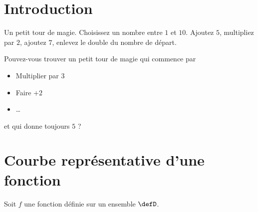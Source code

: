 
\section{Introduction}

\begin{Aprojeter}
    \begin{example} \label{ExemVmCkIH}
        Un petit tour de magie. Choisissez un nombre entre \( 1\) et \( 10\). Ajoutez \( 5\), multipliez par \( 2\), ajoutez \( 7\), enlevez le double du nombre de départ.
    \end{example}
\end{Aprojeter}

\begin{Aprojeter}
    Pouvez-vous trouver un petit tour de magie qui commence par
    \begin{itemize}
        \item Multiplier par \( 3\)
        \item Faire \( +2\)
        \item \ldots
    \end{itemize}
    et qui donne toujours \( 5\) ?
\end{Aprojeter}

\begin{Aprojeter}
    
\end{Aprojeter}

\section{Courbe représentative d'une fonction}

Soit $f$ une fonction définie sur un ensemble $\defD$.

